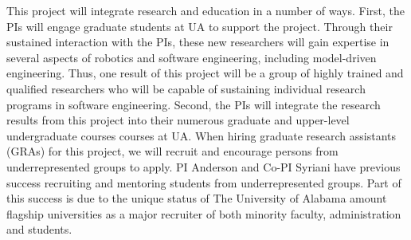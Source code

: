 This project will integrate research and education in a number of ways.
First, the PIs will engage graduate students at UA to support the project.
Through their sustained interaction with the PIs, these new researchers will gain expertise in several aspects of robotics and software engineering, including model-driven engineering.
Thus, one result of this project will be a group of highly trained and qualified researchers who will be capable of sustaining individual research programs in software engineering.
Second, the PIs will integrate the research results from this project into their numerous graduate and upper-level undergraduate courses courses at UA.
When hiring graduate research assistants (GRAs) for this project, we will recruit and encourage persons from underrepresented groups to apply.
PI Anderson and Co-PI Syriani have previous success recruiting and mentoring students from underrepresented groups.  Part of this success is due to the unique status of The University of Alabama amount flagship universities as a major recruiter of both minority faculty, administration and students.






